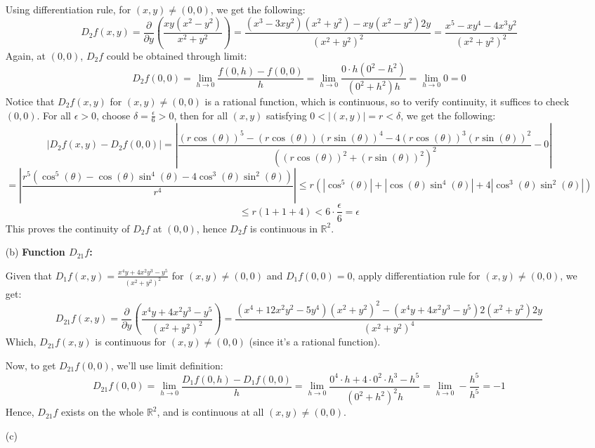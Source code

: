 \documentclass{article}
\begin{document}
\begin{itemize}
    Using differentiation rule, for $(x,y)\neq (0,0)$, we get the following:
    $$D_2f(x,y)=\frac{\partial}{\partial y}\left(\frac{xy(x^2-y^2)}{x^2+y^2}\right) = \frac{(x^3-3xy^2)(x^2+y^2)-xy(x^2-y^2)2y}{(x^2+y^2)^2} = \frac{x^5-xy^4-4x^3y^2}{(x^2+y^2)^2}$$
    Again, at $(0,0)$, $D_2f$ could be obtained through limit:
    $$D_2f(0,0)=\lim_{h\rightarrow 0}\frac{f(0,h)-f(0,0)}{h} = \lim_{h\rightarrow 0}\frac{0\cdot h(0^2-h^2)}{(0^2+h^2)h} = \lim_{h\rightarrow 0}0=0$$
    Notice that $D_2f(x,y)$ for $(x,y)\neq (0,0)$ is a rational function, which is continuous, so to verify continuity, it suffices to check $(0,0)$. For all $\epsilon>0$, choose $\delta=\frac{\epsilon}{6}>0$, then for all $(x,y)$ satisfying $0<|(x,y)|=r<\delta$, we get the following:
    $$|D_2f(x,y)-D_2f(0,0)|=\left|\frac{(r\cos(\theta))^5-(r\cos(\theta))(r\sin(\theta))^4-4(r\cos(\theta))^3(r\sin(\theta))^2}{((r\cos(\theta))^2+(r\sin(\theta))^2)^2}-0\right|$$
    $$= \left|\frac{r^5(\cos^5(\theta)-\cos(\theta)\sin^4(\theta)-4\cos^3(\theta)\sin^2(\theta))}{r^4}\right| \leq r(|\cos^5(\theta)|+|\cos(\theta)\sin^4(\theta)|+4|\cos^3(\theta)\sin^2(\theta)|)$$
    $$ \leq r(1+1+4) < 6\cdot \frac{\epsilon}{6} = \epsilon$$
    This proves the continuity of $D_2f$ at $(0,0)$, hence $D_2f$ is continuous in $\mathbb{R}^2$.

    \hfil

    \hfil

    \item[(b)] \textbf{Function $D_{21}f$:}
    
    Given that $D_1f(x,y)=\frac{x^4y+4x^2y^3-y^5}{(x^2+y^2)^2}$ for $(x,y)\neq (0,0)$ and $D_1f(0,0)=0$, apply differentiation rule for $(x,y)\neq (0,0)$, we get:
    $$D_{21}f(x,y) = \frac{\partial}{\partial y}\left(\frac{x^4y+4x^2y^3-y^5}{(x^2+y^2)^2}\right) = \frac{(x^4+12x^2y^2-5y^4)(x^2+y^2)^2-(x^4y+4x^2y^3-y^5)2(x^2+y^2)2y}{(x^2+y^2)^4}$$
    Which, $D_{21}f(x,y)$ is continuous for $(x,y)\neq (0,0)$ (since it's a rational function).

    Now, to get $D_{21}f(0,0)$, we'll use limit definition:
    $$D_{21}f(0,0)=\lim_{h\rightarrow 0}\frac{D_1f(0,h)-D_1f(0,0)}{h} = \lim_{h\rightarrow 0}\frac{0^4\cdot h + 4\cdot 0^2\cdot h^3-h^5}{(0^2+h^2)^2 h} = \lim_{h\rightarrow 0}-\frac{h^5}{h^5}=-1$$
    Hence, $D_{21}f$ exists on the whole $\mathbb{R}^2$, and is continuous at all $(x,y)\neq (0,0)$.
    \item[(c)]  
\end{itemize}

\break
\end{document}
